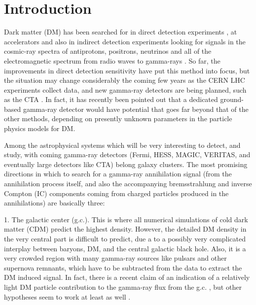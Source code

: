 \documentclass[10pt,aps,pra,reprint,amsmath,amsfonts,amssymb,showpacs,nofootinbib,floatfix]{revtex4-1}
\begin{document}
\maketitle
\section{Introduction}

Dark matter (DM) has been searched for in direct detection experiments
\cite{Pato:2010zk}, at accelerators
\cite{Ellis:2001hv,Baer:2006ff,Khachatryan:2011tk} and also in
indirect detection experiments looking for signals in the cosmic-ray
spectra of antiprotons, positrons, neutrinos and all of the
electromagnetic spectrum from radio waves to gamma-rays
\cite{Bergstrom:2009ib}. So far, the improvements in direct detection
sensitivity have put this method into focus, but the situation may
change considerably the coming few years as the CERN LHC experiments
collect data, and new gamma-ray detectors are being planned, such as
the CTA \cite{Consortium:2010bc}. In fact, it has recently been
pointed out \cite{Bergstrom:2010gh} that a dedicated ground-based
gamma-ray detector would have potential that goes far beyond that of
the other methods, depending on presently unknown parameters in the
particle physics models for DM.

Among the astrophysical systems which will be very interesting to
detect, and study, with coming gamma-ray detectors (Fermi, HESS,
MAGIC, VERITAS, and eventually large detectors like CTA) belong galaxy
clusters. The most promising directions in which to search for a
gamma-ray annihilation signal (from the annihilation process itself,
and also the accompanying bremsstrahlung and inverse Compton (IC)
components coming from charged particles produced in the annihilations)
are basically three:

1. The galactic center (g.c.). This is where all numerical simulations
of cold dark matter (CDM) predict the highest density. However, the
detailed DM density in the very central part is difficult to predict,
due a to a possibly very complicated interplay between baryons, DM,
and the central galactic black hole. Also, it is a very crowded region
with many gamma-ray sources like pulsars and other supernova remnants,
which have to be subtracted from the data to extract the DM induced
signal. In fact, there is a recent claim of an indication of a
relatively light DM particle contribution to the gamma-ray flux from
the g.c. \cite{2010arXiv1010.2752H}, 
but other hypotheses seem to work
at least as well \cite{2010arXiv1012.5839B}.
\end{document}
